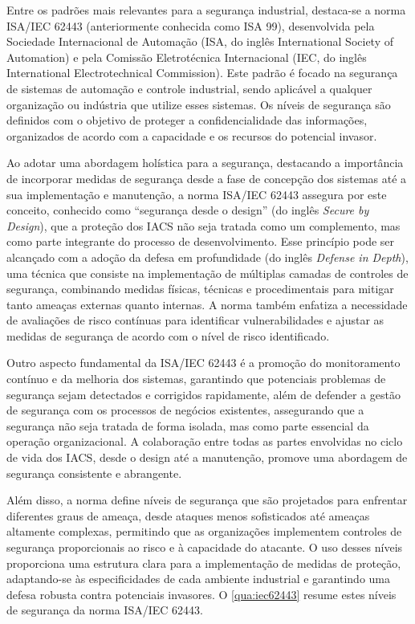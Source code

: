         Entre os padrões mais relevantes para a segurança industrial, destaca-se a norma ISA/IEC 62443 (anteriormente conhecida como ISA 99), desenvolvida pela Sociedade Internacional de Automação (ISA, do inglês International Society of Automation) e pela Comissão Eletrotécnica Internacional (IEC, do inglês International Electrotechnical Commission). Este padrão é focado na segurança de sistemas de automação e controle industrial, sendo aplicável a qualquer organização ou indústria que utilize esses sistemas. Os níveis de segurança são definidos com o objetivo de proteger a confidencialidade das informações, organizados de acordo com a capacidade e os recursos do potencial invasor.

        Ao adotar uma abordagem holística para a segurança, destacando a importância de incorporar medidas de segurança desde a fase de concepção dos sistemas até a sua implementação e manutenção, a norma ISA/IEC 62443 assegura por este conceito, conhecido como ``segurança desde o design'' (do inglês \textit{Secure by Design}), que a proteção dos IACS não seja tratada como um complemento, mas como parte integrante do processo de desenvolvimento. Esse princípio pode ser alcançado com a adoção da defesa em profundidade (do inglês \textit{Defense in Depth}), uma técnica que consiste na implementação de múltiplas camadas de controles de segurança, combinando medidas físicas, técnicas e procedimentais para mitigar tanto ameaças externas quanto internas. A norma também enfatiza a necessidade de avaliações de risco contínuas para identificar vulnerabilidades e ajustar as medidas de segurança de acordo com o nível de risco identificado.

        Outro aspecto fundamental da ISA/IEC 62443 é a promoção do monitoramento contínuo e da melhoria dos sistemas, garantindo que potenciais problemas de segurança sejam detectados e corrigidos rapidamente, além de defender a gestão de segurança com os processos de negócios existentes, assegurando que a segurança não seja tratada de forma isolada, mas como parte essencial da operação organizacional. A colaboração entre todas as partes envolvidas no ciclo de vida dos IACS, desde o design até a manutenção, promove uma abordagem de segurança consistente e abrangente. 
        
        Além disso, a norma define níveis de segurança que são projetados para enfrentar diferentes graus de ameaça, desde ataques menos sofisticados até ameaças altamente complexas, permitindo que as organizações implementem controles de segurança proporcionais ao risco e à capacidade do atacante. O uso desses níveis proporciona uma estrutura clara para a implementação de medidas de proteção, adaptando-se às especificidades de cada ambiente industrial e garantindo uma defesa robusta contra potenciais invasores. O \autoref{qua:iec62443} resume estes níveis de segurança da norma ISA/IEC 62443.

